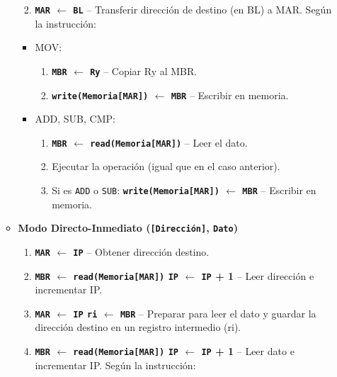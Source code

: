 \documentclass[12pt,oneside]{templates/unerthesis}
\providecommand{\tightlist}{%
  \setlength{\itemsep}{0pt}\setlength{\parskip}{0pt}}
\begin{document}
\begin{itemize}
\begin{itemize}
    \begin{enumerate}
    \def\labelenumi{\arabic{enumi}.}
    \setcounter{enumi}{3}
    \tightlist
    \item
      \textbf{\texttt{MAR} \(\leftarrow\) \texttt{BL}} -- Transferir dirección de destino (en BL) a MAR.
      Según la instrucción:
    \end{enumerate}

    \begin{itemize}
    \tightlist
    \item
      MOV:

      \begin{enumerate}
      \def\labelenumi{\arabic{enumi}.}
      \setcounter{enumi}{4}
      \tightlist
      \item
        \textbf{\texttt{MBR} \(\leftarrow\) \texttt{Ry}} -- Copiar Ry al MBR.
      \item
        \textbf{\texttt{write(Memoria{[}MAR{]})} \(\leftarrow\) \texttt{MBR}} -- Escribir en memoria.
      \end{enumerate}
    \item
      ADD, SUB, CMP:

      \begin{enumerate}
      \def\labelenumi{\arabic{enumi}.}
      \setcounter{enumi}{4}
      \tightlist
      \item
        \textbf{\texttt{MBR} \(\leftarrow\) \texttt{read(Memoria{[}MAR{]})}} -- Leer el dato.
      \item
        Ejecutar la operación (igual que en el caso anterior).
      \item
        Si es \texttt{ADD} o \texttt{SUB}: \textbf{\texttt{write(Memoria{[}MAR{]})} \(\leftarrow\) \texttt{MBR}} -- Escribir en memoria.
      \end{enumerate}
    \end{itemize}
  \item
    \textbf{Modo Directo-Inmediato (\texttt{{[}Dirección{]}}, \texttt{Dato})}

    \begin{enumerate}
    \def\labelenumi{\arabic{enumi}.}
    \setcounter{enumi}{3}
    \tightlist
    \item
      \textbf{\texttt{MAR} \(\leftarrow\) \texttt{IP}} -- Obtener dirección destino.
    \item
      \textbf{\texttt{MBR} \(\leftarrow\) \texttt{read(Memoria{[}MAR{]})} \textbar{} \texttt{IP} \(\leftarrow\) \texttt{IP} + 1} -- Leer dirección e incrementar IP.
    \item
      \textbf{\texttt{MAR} \(\leftarrow\) \texttt{IP} \textbar{} \texttt{ri} \(\leftarrow\) \texttt{MBR}} -- Preparar para leer el dato y guardar la dirección destino en un registro intermedio (ri).
    \item
      \textbf{\texttt{MBR} \(\leftarrow\) \texttt{read(Memoria{[}MAR{]})} \textbar{} \texttt{IP} \(\leftarrow\) \texttt{IP} + 1} -- Leer dato e incrementar IP.
      Según la instrucción:
    \end{enumerate}


\end{itemize}
\end{itemize}
\end{document}
